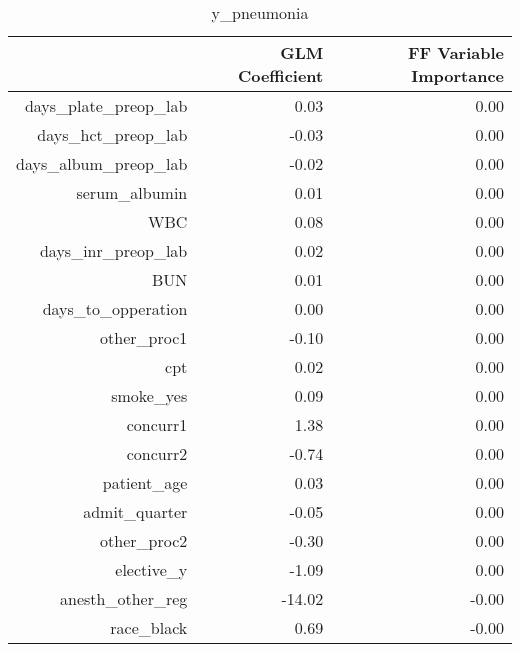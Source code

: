 \begin{table}[ht]
\centering
\begin{tabular}{rrr}
  \hline
 & GLM Coefficient & FF Variable Importance \\ 
  \hline
days\_plate\_preop\_lab & 0.03 & 0.00 \\ 
  days\_hct\_preop\_lab & -0.03 & 0.00 \\ 
  days\_album\_preop\_lab & -0.02 & 0.00 \\ 
  serum\_albumin & 0.01 & 0.00 \\ 
  WBC & 0.08 & 0.00 \\ 
  days\_inr\_preop\_lab & 0.02 & 0.00 \\ 
  BUN & 0.01 & 0.00 \\ 
  days\_to\_opperation & 0.00 & 0.00 \\ 
  other\_proc1 & -0.10 & 0.00 \\ 
  cpt & 0.02 & 0.00 \\ 
  smoke\_yes & 0.09 & 0.00 \\ 
  concurr1 & 1.38 & 0.00 \\ 
  concurr2 & -0.74 & 0.00 \\ 
  patient\_age & 0.03 & 0.00 \\ 
  admit\_quarter & -0.05 & 0.00 \\ 
  other\_proc2 & -0.30 & 0.00 \\ 
  elective\_y & -1.09 & 0.00 \\ 
  anesth\_other\_reg & -14.02 & -0.00 \\ 
  race\_black & 0.69 & -0.00 \\ 
   \hline
\end{tabular}
\caption{y_pneumonia} 
\end{table}

